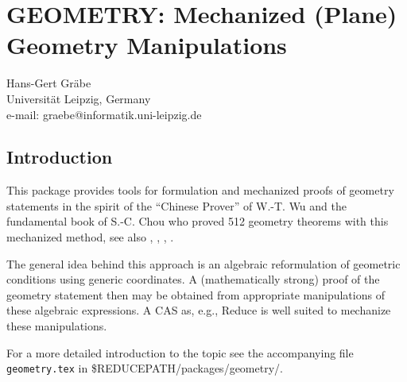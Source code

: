 \chapter[GEOMETRY: Plane geometry]%
{GEOMETRY: Mechanized (Plane) Geometry Manipulations}
\label{GEOMETRY}

\newcommand{\xxyy}[2] {\noindent{\f{#1}} \\\hspace*{1cm}
   \parbox[t]{9cm}{#2} \\[6pt]}
\newcommand{\geo}{{\sc Geometry}}
\newenvironment{code}{\tt \begin{tabbing}
   \hspace*{1cm}\=\hspace*{1cm}\=\hspace*{1cm}\=
   \hspace*{1cm}\=\hspace*{1cm}\=\kill}{\end{tabbing}}

{\footnotesize
\begin{center}
Hans-Gert Gr\"abe \\
Universit\"at Leipzig, Germany \\
e-mail: graebe@informatik.uni-leipzig.de \\
\end{center}
}

\section{Introduction}

This package provides tools for formulation and mechanized proofs of
geometry statements in the spirit of the ``Chinese Prover'' of
W.-T. Wu \cite{Wu:94} and the fundamental book \cite{Chou:88} of
S.-C. Chou who proved 512 geometry theorems with this mechanized
method, see also \cite{Chou:84}, \cite{Chou:90}, \cite{Wu:84a},
\cite{Wu:84b}.

The general idea behind this approach is an algebraic reformulation of
geometric conditions using generic coordinates. A (mathematically
strong) proof of the geometry statement then may be obtained from
appropriate manipulations of these algebraic expressions.  A CAS as,
e.g., Reduce is well suited to mechanize these manipulations. 

For a more detailed introduction to the topic see the accompanying
file {\tt geometry.tex} in \$REDUCEPATH/packages/geometry/.


